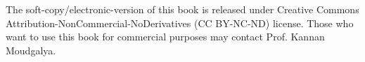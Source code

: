 \noindent The soft-copy/electronic-version of this book is released under Creative Commons Attribution-NonCommercial-NoDerivatives (CC BY-NC-ND)
license.  Those who want to use this book for commercial purposes may contact Prof. Kannan Moudgalya.

\cleardoublepage

